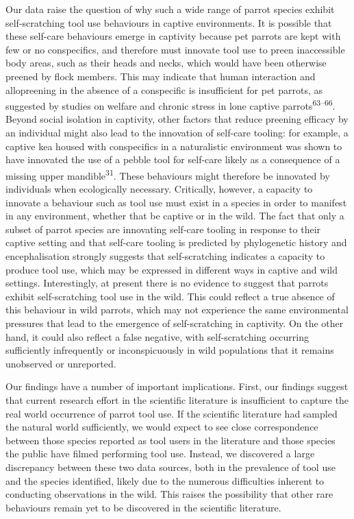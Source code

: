 \documentclass[
  man, donotrepeattitle,floatsintext]{apa6}
\begin{document}
Our data raise the question of why such a wide range of parrot species exhibit
self-scratching tool use behaviours in captive environments. It is possible that
these self-care behaviours emerge in captivity because pet parrots are kept with
few or no conspecifics, and therefore must innovate tool use to preen
inaccessible body areas, such as their heads and necks, which would have been
otherwise preened by flock members. This may indicate that human interaction and
allopreening in the absence of a conspecific is insufficient for pet parrots, as
suggested by studies on welfare and chronic stress in lone captive parrots\textsuperscript{63--66}. Beyond social
isolation in captivity, other factors that reduce preening efficacy by an
individual might also lead to the innovation of self-care tooling: for example,
a captive kea housed with conspecifics in a naturalistic environment was shown
to have innovated the use of a pebble tool for self-care likely as a consequence
of a missing upper mandible\textsuperscript{31}. These behaviours might therefore be
innovated by individuals when ecologically necessary. Critically, however, a
capacity to innovate a behaviour such as tool use must exist in a species in
order to manifest in any environment, whether that be captive or in the wild.
The fact that only a subset of parrot species are innovating self-care tooling
in response to their captive setting and that self-care tooling is predicted by
phylogenetic history and encephalisation strongly suggests that self-scratching
indicates a capacity to produce tool use, which may be expressed in different
ways in captive and wild settings. Interestingly, at present there is no
evidence to suggest that parrots exhibit self-scratching tool use in the wild.
This could reflect a true absence of this behaviour in wild parrots, which may
not experience the same environmental pressures that lead to the emergence of
self-scratching in captivity. On the other hand, it could also reflect a false
negative, with self-scratching occurring sufficiently infrequently or
inconspicuously in wild populations that it remains unobserved or unreported.

Our findings have a number of important implications. First, our findings
suggest that current research effort in the scientific literature is
insufficient to capture the real world occurrence of parrot tool use. If the
scientific literature had sampled the natural world sufficiently, we would
expect to see close correspondence between those species reported as tool users
in the literature and those species the public have filmed performing tool use.
Instead, we discovered a large discrepancy between these two data sources, both
in the prevalence of tool use and the species identified, likely due to the
numerous difficulties inherent to conducting observations in the wild. This
raises the possibility that other rare behaviours remain yet to be discovered in
the scientific literature.
\end{document}
